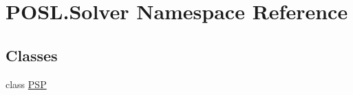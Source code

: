 \hypertarget{namespacePOSL_1_1Solver}{}\section{P\+O\+S\+L.\+Solver Namespace Reference}
\label{namespacePOSL_1_1Solver}
\subsection*{Classes}
\begin{DoxyCompactItemize}
\item 
class \hyperlink{classPOSL_1_1Solver_1_1PSP}{P\+SP}
\end{DoxyCompactItemize}
